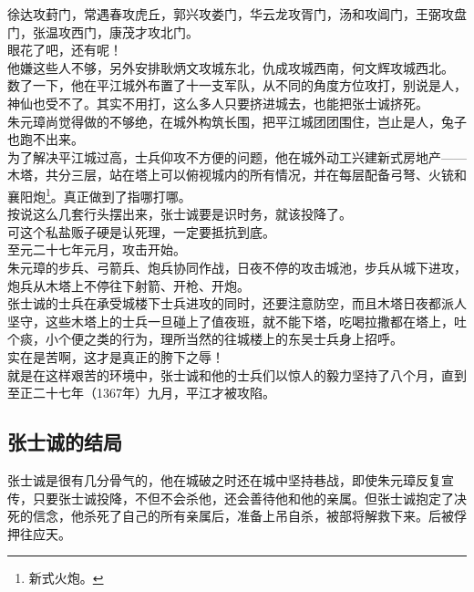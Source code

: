 \begin{multicols}{\theparacolNo}
徐达攻葑门，常遇春攻虎丘，郭兴攻娄门，华云龙攻胥门，汤和攻阊门，王弼攻盘门，张温攻西门，康茂才攻北门。\\

眼花了吧，还有呢！\\

他嫌这些人不够，另外安排耿炳文攻城东北，仇成攻城西南，何文辉攻城西北。\\

数了一下，他在平江城外布置了十一支军队，从不同的角度方位攻打，别说是人，神仙也受不了。其实不用打，这么多人只要挤进城去，也能把张士诚挤死。\\

朱元璋尚觉得做的不够绝，在城外构筑长围，把平江城团团围住，岂止是人，兔子也跑不出来。\\

为了解决平江城过高，士兵仰攻不方便的问题，他在城外动工兴建新式房地产——木塔，共分三层，站在塔上可以俯视城内的所有情况，并在每层配备弓弩、火铳和襄阳炮\footnote{新式火炮。}。真正做到了指哪打哪。\\

按说这么几套行头摆出来，张士诚要是识时务，就该投降了。\\

可这个私盐贩子硬是认死理，一定要抵抗到底。\\

至元二十七年元月，攻击开始。\\

朱元璋的步兵、弓箭兵、炮兵协同作战，日夜不停的攻击城池，步兵从城下进攻，炮兵从木塔上不停往下射箭、开枪、开炮。\\

张士诚的士兵在承受城楼下士兵进攻的同时，还要注意防空，而且木塔日夜都派人坚守，这些木塔上的士兵一旦碰上了值夜班，就不能下塔，吃喝拉撒都在塔上，吐个痰，小个便之类的行为，理所当然的往城楼上的东吴士兵身上招呼。\\

实在是苦啊，这才是真正的胯下之辱！\\

就是在这样艰苦的环境中，张士诚和他的士兵们以惊人的毅力坚持了八个月，直到至正二十七年（1367年）九月，平江才被攻陷。\\

\subsection{张士诚的结局}
张士诚是很有几分骨气的，他在城破之时还在城中坚持巷战，即使朱元璋反复宣传，只要张士诚投降，不但不会杀他，还会善待他和他的亲属。但张士诚抱定了决死的信念，他杀死了自己的所有亲属后，准备上吊自杀，被部将解救下来。后被俘押往应天。\\


\end{multicols}
